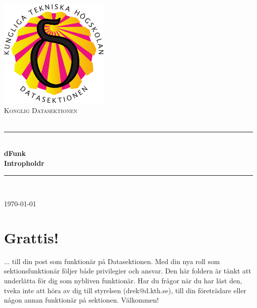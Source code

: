 \documentclass[a4paper,11pt]{article}
\title{\MyTitle}
\author{D-rektoratet}
\date{\today}
\newcommand{\HRule}{\rule{\linewidth}{0.5mm}}
\newcommand{\Subject}{}
\newcommand{\MyTitle}{Intropholdr}
\newcommand{\MySubTitle}{dFunk}
\begin{document}
\begin{titlepage}
\begin{center}

\includegraphics[width=0.4\textwidth]{skold.pdf}\\[1cm]

\textsc{\LARGE Konglig Datasektionen}\\[0.5cm]

\textsc{\Large \Subject}\\[0.5cm]


\HRule \\[0.7cm]
{ \huge \bfseries \MySubTitle}\\[0.4cm]
{ \huge \bfseries \MyTitle}\\[0.4cm]

\HRule \\[0.7cm]

\vfill

{\large \today}

\end{center}
\end{titlepage}


\tableofcontents
\pagebreak

\section{Grattis!}
... till din post som funktionär på Datasektionen. Med din nya roll som sektionsfunktionär följer både privilegier och ansvar. Den här foldern är tänkt att underlätta för dig som nybliven funktionär. Har du frågor när du har läst den, tveka inte att höra av dig till styrelsen (drek@d.kth.se), till din företrädare eller någon annan funktionär på sektionen. Välkommen!
\end{document}
